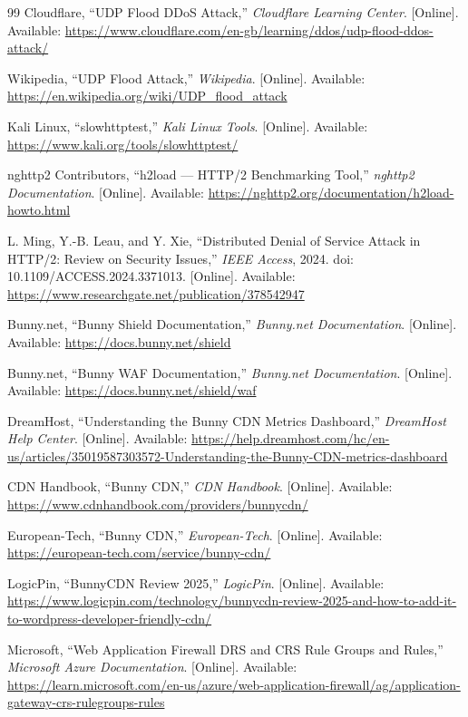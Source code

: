 \documentclass[12pt, a4paper]{report}   %
\begin{document}
\begin{thebibliography}{99}
Cloudflare, ``UDP Flood DDoS Attack,'' \textit{Cloudflare Learning Center}.
[Online]. Available:
\url{https://www.cloudflare.com/en-gb/learning/ddos/udp-flood-ddos-attack/}

Wikipedia, ``UDP Flood Attack,'' \textit{Wikipedia}. [Online]. Available:
\url{https://en.wikipedia.org/wiki/UDP_flood_attack}

Kali Linux, ``slowhttptest,'' \textit{Kali Linux Tools}. [Online]. Available:
\url{https://www.kali.org/tools/slowhttptest/}

nghttp2 Contributors, ``h2load — HTTP/2 Benchmarking Tool,'' \textit{nghttp2
Documentation}. [Online]. Available:
\url{https://nghttp2.org/documentation/h2load-howto.html}

L. Ming, Y.-B. Leau, and Y. Xie, ``Distributed Denial of Service Attack in HTTP/2:
Review on Security Issues,'' \textit{IEEE Access}, 2024.
doi: 10.1109/ACCESS.2024.3371013. [Online]. Available:
\url{https://www.researchgate.net/publication/378542947}

Bunny.net, ``Bunny Shield Documentation,'' \textit{Bunny.net Documentation}.
[Online]. Available: \url{https://docs.bunny.net/shield}

Bunny.net, ``Bunny WAF Documentation,'' \textit{Bunny.net Documentation}.
[Online]. Available: \url{https://docs.bunny.net/shield/waf}

DreamHost, ``Understanding the Bunny CDN Metrics Dashboard,'' \textit{DreamHost
Help Center}. [Online]. Available:
\url{https://help.dreamhost.com/hc/en-us/articles/35019587303572-Understanding-the-Bunny-CDN-metrics-dashboard}

CDN Handbook, ``Bunny CDN,'' \textit{CDN Handbook}. [Online]. Available:
\url{https://www.cdnhandbook.com/providers/bunnycdn/}

European-Tech, ``Bunny CDN,'' \textit{European-Tech}. [Online]. Available:
\url{https://european-tech.com/service/bunny-cdn/}

LogicPin, ``BunnyCDN Review 2025,'' \textit{LogicPin}. [Online]. Available:
\url{https://www.logicpin.com/technology/bunnycdn-review-2025-and-how-to-add-it-to-wordpress-developer-friendly-cdn/}

Microsoft, ``Web Application Firewall DRS and CRS Rule Groups and Rules,''
\textit{Microsoft Azure Documentation}. [Online]. Available:
\url{https://learn.microsoft.com/en-us/azure/web-application-firewall/ag/application-gateway-crs-rulegroups-rules}


\end{thebibliography}
\end{document}
